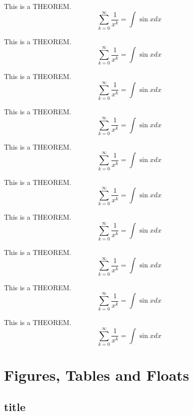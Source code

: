 \documentclass[twoside]{fduthesis-2026-en}
\begin{document}
\begin{cb}
This is a THEOREM.
\[ \sum_{k=0}^{\infty} \frac{1}{x^k} = \int \sin x dx \]
\end{cb}


\begin{np}
This is a THEOREM.
\[ \sum_{k=0}^{\infty} \frac{1}{x^k} = \int \sin x dx \]
\end{np}

\begin{nmm}
This is a THEOREM.
\[ \sum_{k=0}^{\infty} \frac{1}{x^k} = \int \sin x dx \]
\end{nmm}

\begin{nfduc}
This is a THEOREM.
\[ \sum_{k=0}^{\infty} \frac{1}{x^k} = \int \sin x dx \]
\end{nfduc}

\begin{nfdub}
This is a THEOREM.
\[ \sum_{k=0}^{\infty} \frac{1}{x^k} = \int \sin x dx \]
\end{nfdub}

\begin{nmb}
This is a THEOREM.
\[ \sum_{k=0}^{\infty} \frac{1}{x^k} = \int \sin x dx \]
\end{nmb}

\begin{ncb}
This is a THEOREM.
\[ \sum_{k=0}^{\infty} \frac{1}{x^k} = \int \sin x dx \]
\end{ncb}

\begin{ncb}
This is a THEOREM.
\[ \sum_{k=0}^{\infty} \frac{1}{x^k} = \int \sin x dx \]
\end{ncb}

\begin{ncb}
This is a THEOREM.
\[ \sum_{k=0}^{\infty} \frac{1}{x^k} = \int \sin x dx \]
\end{ncb}

\begin{ncb}
This is a THEOREM.
\[ \sum_{k=0}^{\infty} \frac{1}{x^k} = \int \sin x dx \]
\end{ncb}

\chapter{Figures, Tables and Floats}

\section{title}
\end{document}

